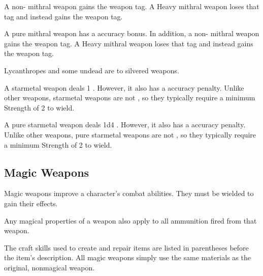        A non- mithral weapon gains the  weapon tag.
      A Heavy mithral weapon loses that tag and instead gains the  weapon tag.

       A pure mithral weapon has a  accuracy bonus.
      In addition, a non- mithral weapon gains the  weapon tag.
      A Heavy mithral weapon loses that tag and instead gains the  weapon tag.

       Lycanthropes and some undead are \vulnerable to silvered weapons.

       A starmetal weapon deals 1 .
      However, it also has a  accuracy penalty.
      Unlike other weapons, starmetal weapons are not , so they typically require a minimum Strength of 2 to wield.

       A pure starmetal weapon deals 1d4 .
      However, it also has a  accuracy penalty.
      Unlike other weapons, pure starmetal weapons are not , so they typically require a minimum Strength of 2 to wield.

      \begin{longcolumn}
        \section{Magic Weapons}\label{Magic Weapons}
          \begin{longtablepreface}

            Magic weapons improve a character's combat abilities.
            They must be wielded to gain their effects.

             Any magical properties of a  weapon also apply to all ammunition fired from that weapon.

             The craft skills used to create and repair items are listed in parentheses before the item's description.
            All magic weapons simply use the same materials as the original, nonmagical weapon.
          \end{longtablepreface}

          

      \end{longcolumn}

